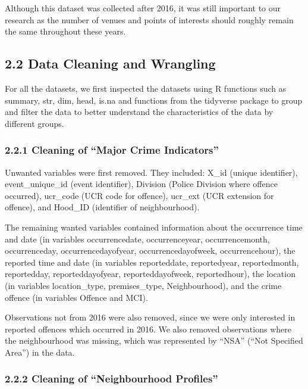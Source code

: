 \documentclass[
]{article}
\begin{document}
Although this dataset was collected after 2016, it was still important
to our research as the number of venues and points of interests should
roughly remain the same throughout these years.

\hypertarget{data-cleaning-and-wrangling}{%
\subsection{2.2 Data Cleaning and
Wrangling}\label{data-cleaning-and-wrangling}}

For all the datasets, we first inspected the datasets using R functions
such as summary, str, dim, head, is.na and functions from the tidyverse
package to group and filter the data to better understand the
characteristics of the data by different groups.

\hypertarget{cleaning-of-major-crime-indicators}{%
\subsubsection{2.2.1 Cleaning of ``Major Crime
Indicators''}\label{cleaning-of-major-crime-indicators}}

Unwanted variables were first removed. They included: X\_id (unique
identifier), event\_unique\_id (event identifier), Division (Police
Division where offence occurred), ucr\_code (UCR code for offence),
ucr\_ext (UCR extension for offence), and Hood\_ID (identifier of
neighbourhood).

The remaining wanted variables contained information about the
occurrence time and date (in variables occurrencedate, occurrenceyear,
occurrencemonth, occurrenceday, occurrencedayofyear,
occurrencedayofweek, occurrencehour), the reported time and date (in
variables reporteddate, reportedyear, reportedmonth, reportedday,
reporteddayofyear, reporteddayofweek, reportedhour), the location (in
variables location\_type, premises\_type, Neighbourhood), and the crime
offence (in variables Offence and MCI).

Observations not from 2016 were also removed, since we were only
interested in reported offences which occurred in 2016. We also removed
observations where the neighbourhood was missing, which was represented
by ``NSA'' (``Not Specified Area'') in the data.

\hypertarget{cleaning-of-neighbourhood-profiles}{%
\subsubsection{2.2.2 Cleaning of ``Neighbourhood
Profiles''}\label{cleaning-of-neighbourhood-profiles}}
\end{document}
